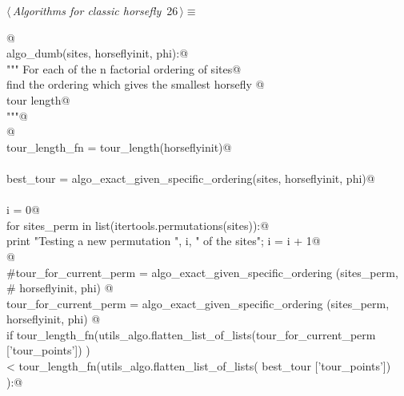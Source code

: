 \documentclass[11.5pt]{report}
\begin{document}
\begin{flushleft} \small
\begin{minipage}{\linewidth}\label{scrap19}\raggedright\small
{} $\langle\,${\itshape Algorithms for classic horsefly}\nobreak\ {\footnotesize {26}}$\,\rangle\equiv$
\vspace{-1ex}
\begin{list}{}{} \item
\mbox{}\verb@   @\\
\mbox{}\verb@def algo_dumb(sites, horseflyinit, phi):@\\
\mbox{}\verb@    """ For each of the n factorial ordering of sites@\\
\mbox{}\verb@    find the ordering which gives the smallest horsefly @\\
\mbox{}\verb@    tour length@\\
\mbox{}\verb@    """@\\
\mbox{}\verb@    @\\
\mbox{}\verb@    tour_length_fn = tour_length(horseflyinit)@\\
\mbox{}\verb@@\\
\mbox{}\verb@    best_tour = algo_exact_given_specific_ordering(sites, horseflyinit, phi)@\\
\mbox{}\verb@@\\
\mbox{}\verb@    i = 0@\\
\mbox{}\verb@    for sites_perm in list(itertools.permutations(sites)):@\\
\mbox{}\verb@        print "Testing a new permutation ", i, " of the sites"; i = i + 1@\\
\mbox{}\verb@          @\\
\mbox{}\verb@        #tour_for_current_perm = algo_exact_given_specific_ordering (sites_perm, \@\\
\mbox{}\verb@        #                                                             horseflyinit, phi) @\\
\mbox{}\verb@        tour_for_current_perm = algo_exact_given_specific_ordering (sites_perm, \@\\
\mbox{}\verb@                                                                    horseflyinit, phi) @\\
\mbox{}\verb@        if tour_length_fn(utils_algo.flatten_list_of_lists(tour_for_current_perm ['tour_points']) ) \@\\
\mbox{}\verb@         < tour_length_fn(utils_algo.flatten_list_of_lists(            best_tour ['tour_points']) ):@\\

\end{list}
\end{minipage}
\end{flushleft}
\end{document}
